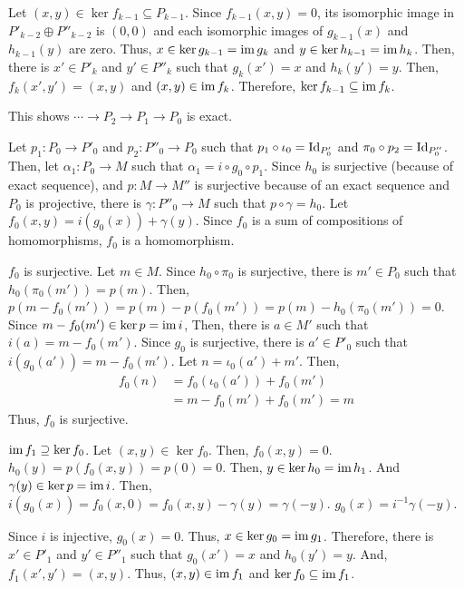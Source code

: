 Let \((x, y) \in \ker f_{k - 1} \subseteq P_{k - 1}\).
Since \(f_{k - 1}(x, y) = 0\), its isomorphic image in \(P'_{k - 2} \oplus P''_{k - 2}\) is \((0, 0)\) and each isomorphic images of \(g_{k - 1}(x)\) and \(h_{k - 1}(y)\) are zero.
Thus, \(x \in \ker g_{k - 1} = \textnormal{im}\, g_k\) and \(y \in \ker h_{k - 1} = \textnormal{im}\, h_k\).
Then, there is \(x' \in P'_k\) and \(y' \in P''_k\) such that \(g_k(x') = x\) and \(h_k(y') = y\).
Then, \(f_k(x', y') = (x, y)\) and \((x, y) \in \textnormal{im}\, f_k\).
Therefore, \(\ker f_{k - 1} \subseteq \textnormal{im}\, f_k\).

This shows \(\cdots \to P_2 \to P_1 \to P_0\) is exact.
\br

Let \(p_1: P_0 \to P'_0\) and \(p_2: P''_0 \to P_0\) such that
\(p_1 \circ \iota_0 = \textnormal{Id}_{P'_0}\) and \(\pi_0 \circ p_2 = \textnormal{Id}_{P''_0}\).
Then, let \(\alpha_1: P_0 \to M\) such that \(\alpha_1 = i \circ g_0 \circ p_1\).
Since \(h_0\) is surjective (because of exact sequence),
and \(p: M \to M''\) is surjective because of an exact sequence
and \(P_0\) is projective,
there is \(\gamma: P''_0 \to M\) such that \(p \circ \gamma = h_0\).
Let \(f_0(x, y) = i(g_0(x)) + \gamma(y)\).
Since \(f_0\) is a sum of compositions of homomorphisms,
\(f_0\) is a homomorphism.

\(f_0\) is surjective.
Let \(m \in M\).
Since \(h_0 \circ \pi_0\) is surjective, there is \(m' \in P_0\) such that \(h_0(\pi_0(m')) = p(m)\).
Then, \(p(m - f_0(m')) = p(m) - p(f_0(m')) = p(m) - h_0(\pi_0(m')) = 0\).
Since \(m - f_0(m') \in \ker p = \textnormal{im}\, i\),
Then, there is \(a \in M'\) such that \(i(a) = m - f_0(m')\).
Since \(g_0\) is surjective, there is \(a' \in P'_0\) such that \(i(g_0(a')) = m - f_0(m')\).
Let \(n = \iota_0(a') + m'\).
Then,
\begin{align*}
  f_0(n)
  &= f_0(\iota_0(a')) + f_0(m')
  \\&= m - f_0(m') + f_0(m') = m
\end{align*}
Thus, \(f_0\) is surjective.

\(\textnormal{im}\, f_1 \supseteq \ker f_0\).
Let \((x, y) \in \ker f_0\).
Then, \(f_0(x, y) = 0\).
\(h_0(y) = p(f_0(x, y)) = p(0) = 0\).
Then, \(y \in \ker h_0 = \textnormal{im}\, h_1\).
And \(\gamma(y) \in \ker p = \textnormal{im}\, i\).
Then, \(i(g_0(x)) = f_0(x, 0) = f_0(x, y) - \gamma(y) = \gamma(-y)\).
\(g_0(x) = i^{-1}\gamma(-y)\).

Since \(i\) is injective, \(g_0(x) = 0\).
Thus, \(x \in \ker g_0 = \textnormal{im}\, g_1\).
Therefore, there is \(x' \in P'_1\) and \(y' \in P''_1\)
such that \(g_0(x') = x\) and \(h_0(y') = y\).
And, \(f_1(x', y') = (x, y)\).
Thus, \((x, y) \in \textnormal{im}\, f_1\)
and \(\ker f_0 \subseteq \textnormal{im}\, f_1\).

